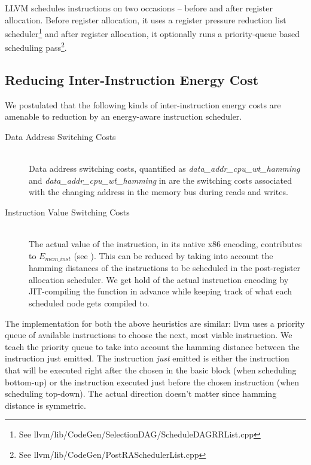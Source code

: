 LLVM schedules instructions on two occasions -- before and after
register allocation.  Before register allocation, it uses a register
pressure reduction list scheduler\footnote{See
  llvm/lib/CodeGen/SelectionDAG/ScheduleDAGRRList.cpp} and after
register allocation, it optionally runs a priority-queue based
scheduling pass\footnote{See
  llvm/lib/CodeGen/PostRASchedulerList.cpp}.

\subsection{Reducing Inter-Instruction Energy Cost}

We postulated that the following kinds of inter-instruction energy
costs are amenable to reduction by an energy-aware instruction
scheduler.

\begin{description}
  \item[Data Address Switching Costs] \hfill \\ Data address switching
    costs, quantified as \textit{data\_addr\_cpu\_wt\_hamming} and
    \textit{data\-\_addr\_cpu\_wt\_hamming} in
     are the switching costs associated
    with the changing address in the memory bus during reads and
    writes.

  \item[Instruction Value Switching Costs] \hfill \\ The actual value
    of the instruction, in its native x86 encoding, contributes to
    $E_{mem\_inst}$ (see ).  This can be
    reduced by taking into account the hamming distances of the
    instructions to be scheduled in the post-register allocation
    scheduler.  We get hold of the actual instruction encoding by
    JIT-compiling the function in advance while keeping track of what
    each scheduled node gets compiled to.
\end{description}

The implementation for both the above heuristics are similar: llvm
uses a priority queue of available instructions to choose the next,
most viable instruction.  We teach the priority queue to take into
account the hamming distance between the instruction just emitted.
The instruction \textit{just} emitted is either the instruction that
will be executed right after the chosen in the basic block (when
scheduling bottom-up) or the instruction executed just before the
chosen instruction (when scheduling top-down).  The actual direction
doesn't matter since hamming distance is symmetric.

